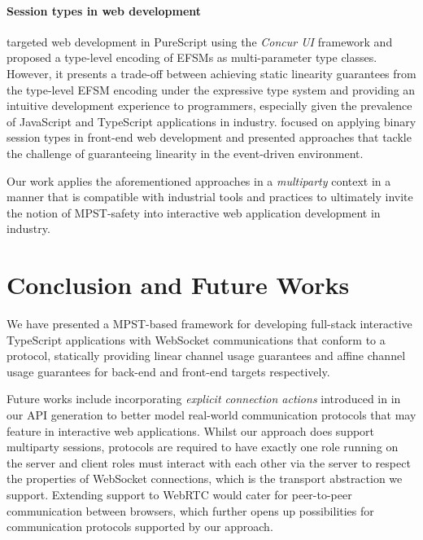 \documentclass[submission,copyright,creativecommons]{eptcs}
\begin{document}
\paragraph{Session types in web development} \cite{PureScript2019} targeted web development in PureScript using the \textit{Concur UI} framework and proposed a type-level encoding of EFSMs as multi-parameter type classes. However, it presents a trade-off between achieving static linearity guarantees from the type-level EFSM encoding under the expressive type system and providing an intuitive development experience to programmers, especially given the prevalence of JavaScript and TypeScript applications in industry. \cite{MVU2019} focused on applying binary session types in front-end web development and presented approaches that tackle the challenge of guaranteeing linearity in the event-driven environment. 

Our work applies the aforementioned approaches in a \textit{multiparty} context in a manner that is compatible with industrial tools and practices to ultimately invite the notion of MPST-safety into interactive web application development in industry.

\section{Conclusion and Future Works}
We have presented a MPST-based framework for developing full-stack interactive TypeScript applications with WebSocket communications that conform to a protocol, statically providing linear channel usage guarantees and affine channel usage guarantees for back-end and front-end targets respectively.

Future works include incorporating \textit{explicit connection actions} introduced in \cite{ExplicitConnections} in our API generation to better model real-world communication protocols that may feature in interactive web applications. Whilst our approach does support multiparty sessions, protocols are required to have exactly one role running on the server and client roles must interact with each other via the server to respect the properties of WebSocket connections, which is the transport abstraction we support. Extending support to WebRTC would cater for peer-to-peer communication between browsers, which further opens up possibilities for communication protocols supported by our approach.


\nocite{*}


\end{document}
